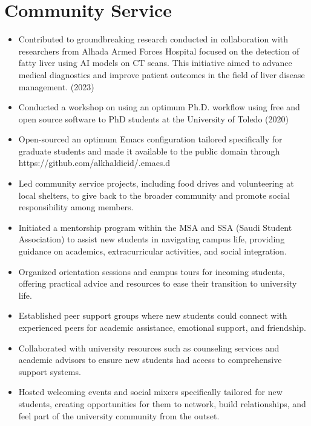 \documentclass[letterpaper,
		10pt]{article}
\begin{document}
\section{Community Service}
\begin{itemize}
\item Contributed to groundbreaking research conducted in collaboration with researchers from Alhada Armed Forces Hospital focused on the detection of fatty liver using AI models on CT scans. This initiative aimed to advance medical diagnostics and improve patient outcomes in the field of liver disease management. (2023)
\item Conducted a workshop on using an optimum Ph.D. workflow using free and open source software to PhD students at the University of Toledo (2020) 
\item Open-sourced an optimum Emacs configuration tailored specifically for graduate students and made it available to the public domain through https://github.com/alkhaldieid/.emacs.d
\item Led community service projects, including food drives and volunteering at local shelters, to give back to the broader community and promote social responsibility among members.
\item Initiated a mentorship program within the MSA and SSA (Saudi Student Association) to assist new students in navigating campus life, providing guidance on academics, extracurricular activities, and social integration.
\item Organized orientation sessions and campus tours for incoming students, offering practical advice and resources to ease their transition to university life.
\item Established peer support groups where new students could connect with experienced peers for academic assistance, emotional support, and friendship.
\item Collaborated with university resources such as counseling services and academic advisors to ensure new students had access to comprehensive support systems.
\item Hosted welcoming events and social mixers specifically tailored for new students, creating opportunities for them to network, build relationships, and feel part of the university community from the outset.
\end{itemize}
\end{document}
